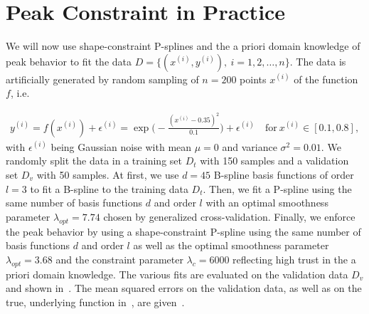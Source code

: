 \section{Peak Constraint in Practice} \label{sec:peak-behav}

We will now use shape-constraint P-splines and the a priori domain knowledge of peak behavior to fit the data $D = \{(x^{(i)}, y^{(i)}), \ i=1,2,\dots,n\}$. The data is artificially generated by random sampling of $n=200$ points $x^{(i)}$ of the function $f$, i.e.

\begin{align} \label{eq:test-func-peak}
	y^{(i)} = f(x^{(i)}) + \epsilon^{(i)} = \exp\big(-\frac{(x^{(i)} - 0.35)^2}{0.1}\big) + \epsilon^{(i)} \quad \text{for} \ x^{(i)} \in [0.1,0.8],
\end{align}
%
with $\epsilon^{(i)}$ being Gaussian noise with mean $\mu = 0$ and variance $\sigma^2 = 0.01$. We randomly split the data in a training set $D_t$ with 150 samples and a validation set $D_v$ with 50 samples. At first, we use $d=45$ B-spline basis functions of order $l=3$ to fit a B-spline to the training data $D_t$. Then, we fit a P-spline using the same number of basis functions $d$ and order $l$ with an optimal smoothness parameter $\lambda_{opt} = 7.74$ chosen by generalized cross-validation. Finally, we enforce the peak behavior by using a shape-constraint P-spline using the same number of basis functions $d$ and order $l$ as well as the optimal smoothness parameter $\lambda_{opt}=3.68$ and the constraint parameter $\lambda_c=6000$ reflecting high trust in the a priori domain knowledge. The various fits are evaluated on the validation data $D_v$ and shown in~. The mean squared errors on the validation data, as well as on the true, underlying function in~, are given~.


